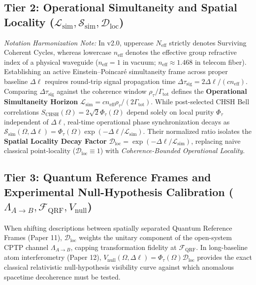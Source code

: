 \documentclass[11pt,a4paper]{article}
\begin{document}
\subsection{Tier 2: Operational Simultaneity and Spatial Locality (\texorpdfstring{$\mathcal{L}_{\mathrm{sim}}, \mathcal{S}_{\mathrm{sim}}, \mathcal{D}_{\mathrm{loc}}$}{Operational Simultaneity})}
\emph{Notation Harmonization Note:} In v2.0, uppercase $N_{\mathrm{eff}}$ strictly denotes Surviving Coherent Cycles, whereas lowercase $n_{\mathrm{eff}}$ denotes the effective group refractive index of a physical waveguide ($n_{\mathrm{eff}} = 1$ in vacuum; $n_{\mathrm{eff}} \approx 1.468$ in telecom fiber). Establishing an active Einstein--Poincaré simultaneity frame across proper baseline $\Delta\ell$ requires round-trip signal propagation time $\Delta\tau_{\mathrm{sig}} = 2\Delta\ell / (c n_{\mathrm{eff}})$. Comparing $\Delta\tau_{\mathrm{sig}}$ against the coherence window $\rho_\tau / \Gamma_{\mathrm{tot}}$ defines the \textbf{Operational Simultaneity Horizon} $\mathcal{L}_{\mathrm{sim}} = c n_{\mathrm{eff}} \rho_\tau / (2\Gamma_{\mathrm{tot}})$. While post-selected CHSH Bell correlations $S_{\mathrm{CHSH}}(\Omega) = 2\sqrt{2}\Phi_\tau(\Omega)$ depend solely on local purity $\Phi_\tau$ independent of $\Delta\ell$, real-time operational phase synchronization decays as $\mathcal{S}_{\mathrm{sim}}(\Omega, \Delta\ell) = \Phi_\tau(\Omega)\exp(-\Delta\ell/\mathcal{L}_{\mathrm{sim}})$. Their normalized ratio isolates the \textbf{Spatial Locality Decay Factor} $\mathcal{D}_{\mathrm{loc}} = \exp(-\Delta\ell/\mathcal{L}_{\mathrm{sim}})$, replacing naive classical point-locality ($\mathcal{D}_{\mathrm{loc}} \equiv 1$) with \emph{Coherence-Bounded Operational Locality}.

\subsection{Tier 3: Quantum Reference Frames and Experimental Null-Hypothesis Calibration (\texorpdfstring{$\Lambda_{A\to B}, \mathcal{F}_{\mathrm{QRF}}, V_{\mathrm{null}}$}{QRF and Null Calibration})}
When shifting descriptions between spatially separated Quantum Reference Frames (Paper 11), $\mathcal{D}_{\mathrm{loc}}$ weights the unitary component of the open-system CPTP channel $\Lambda_{A\to B}$, capping transformation fidelity at $\mathcal{F}_{\mathrm{QRF}}$. In long-baseline atom interferometry (Paper 12), $V_{\mathrm{null}}(\Omega, \Delta\ell) = \Phi_\tau(\Omega)\mathcal{D}_{\mathrm{loc}}$ provides the exact classical relativistic null-hypothesis visibility curve against which anomalous spacetime decoherence must be tested.
\end{document}
